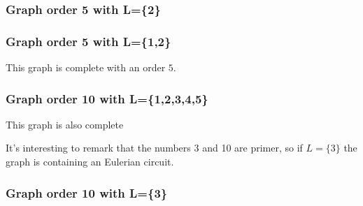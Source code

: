 \subsubsection{Graph  order 5 with L=\{2\}}

\begin{center}
\begin{tkzexample}[vbox]
\end{tkzexample}
\end{center}


\subsubsection{Graph  order 5 with L=\{1,2\}}

This graph is complete with an order $5$.

\begin{center}
\begin{tkzexample}[vbox]
\end{tkzexample}
\end{center}


\subsubsection{Graph  order 10 with L=\{1,2,3,4,5\}}

This graph is also complete

\begin{center}
\begin{tkzexample}[vbox]
\end{tkzexample}
\end{center}

It's interesting to remark that the numbers 3 and 10 are primer, so if $L=\{3\} $ the graph is containing an Eulerian circuit.


\subsubsection{Graph  order 10 with L=\{3\}}
\begin{center}
\begin{tkzexample}[vbox]
\end{tkzexample}
\end{center}

